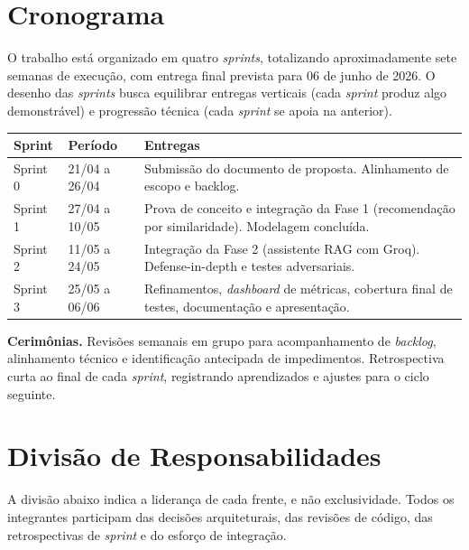 \documentclass[monografia,abnt]{inf-ufg-modificado}
\begin{document}
\chapter{Cronograma}

O trabalho está organizado em quatro \textit{sprints}, totalizando aproximadamente sete semanas de execução, com entrega final prevista para 06 de junho de 2026. O desenho das \textit{sprints} busca equilibrar entregas verticais (cada \textit{sprint} produz algo demonstrável) e progressão técnica (cada \textit{sprint} se apoia na anterior).

\begin{center}
\begin{tabular}{@{} l l p{7cm} @{}}
\toprule
\textbf{Sprint} & \textbf{Período} & \textbf{Entregas} \\
\midrule
Sprint 0 & 21/04 a 26/04 & Submissão do documento de proposta. Alinhamento de escopo e backlog. \\
Sprint 1 & 27/04 a 10/05 & Prova de conceito e integração da Fase 1 (recomendação por similaridade). Modelagem concluída. \\
Sprint 2 & 11/05 a 24/05 & Integração da Fase 2 (assistente RAG com Groq). Defense-in-depth e testes adversariais. \\
Sprint 3 & 25/05 a 06/06 & Refinamentos, \textit{dashboard} de métricas, cobertura final de testes, documentação e apresentação. \\
\bottomrule
\end{tabular}
\end{center}

\noindent\textbf{Cerimônias.} Revisões semanais em grupo para acompanhamento de \textit{backlog}, alinhamento técnico e identificação antecipada de impedimentos. Retrospectiva curta ao final de cada \textit{sprint}, registrando aprendizados e ajustes para o ciclo seguinte.

\chapter{Divisão de Responsabilidades}

A divisão abaixo indica a liderança de cada frente, e não exclusividade. Todos os integrantes participam das decisões arquiteturais, das revisões de código, das retrospectivas de \textit{sprint} e do esforço de integração.
\end{document}
